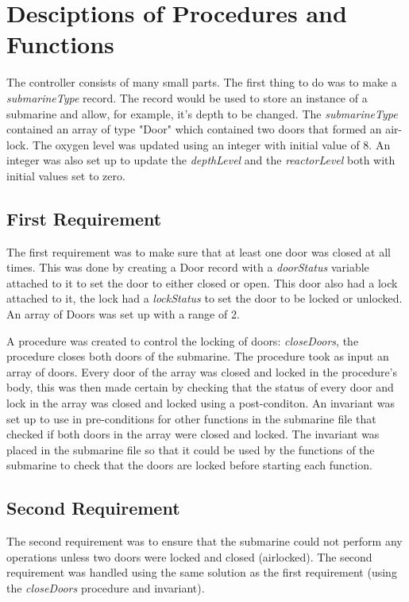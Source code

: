 \section{Desciptions of Procedures and Functions}
The controller consists of many small parts. The first thing to do was to make a \textit{submarineType} record. The record would be used to store an instance of a submarine and allow, for example, it's depth to be changed. The \textit{submarineType} contained an array of type "Door" which contained two doors that formed an air-lock. The oxygen level was updated using an integer with initial value of 8. An integer was also set up to update the \textit{depthLevel} and the \textit{reactorLevel} both with initial values set to zero.

\subsection{First Requirement}
The first requirement was to make sure that at least one door was closed at all times. This was done by creating a Door record with a \textit{doorStatus} variable attached to it to set the door to either closed or open. This door also had a lock attached to it, the lock had a \textit{lockStatus} to set the door to be locked or unlocked. An array of Doors was set up with a range of 2.

 A procedure was created to control the locking of doors: \textit{closeDoors}, the procedure closes both doors of the submarine. The procedure took as input an array of doors. Every door of the array was closed and locked in the procedure's body, this was then made certain by checking that the status of every door and lock in the array was closed and locked using a post-conditon. An invariant was set up to use in pre-conditions for other functions in the submarine file that checked if both doors in the array were closed and locked. The invariant was placed in the submarine file so that it could be used by the functions of the submarine to check that the doors are locked before starting each function.

\subsection{Second Requirement}
The second requirement was to ensure that the submarine could not perform any operations unless two doors were locked and closed (airlocked). The second requirement was handled using the same solution as the first requirement (using the \textit{closeDoors} procedure and invariant).

